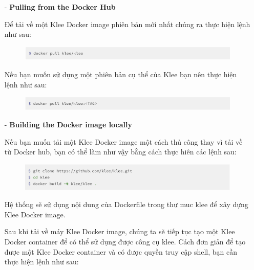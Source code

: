 \documentclass[12pt,a4paper]{article}
\begin{document}
\begin{itemize}
\item[-] \textbf{Pulling from the Docker Hub}

Để tải về một Klee Docker image phiên bản mới nhất chúng ra thực hiện lệnh như sau:

\begin{figure}[ht]
\begin{center}
\includegraphics[scale=.3]{hinhanh/pulldocker.png}
\end{center}
\end{figure}

Nếu bạn muốn sử dụng một phiên bản cụ thể của Klee bạn nên thực hiện lệnh như sau:

\begin{figure}[ht]
\begin{center}
\includegraphics[scale=.3]{hinhanh/pulldockertag.png}
\end{center}
\end{figure}

\item[-] \textbf{Building the Docker image locally}

Nếu bạn muốn tải một Klee Docker image một cách thủ công thay vì tải về từ Docker hub, bạn có thể làm như vậy bằng cách thực hiên các lệnh sau:

\begin{figure}[ht]
\begin{center}
\includegraphics[scale=0.3]{hinhanh/builddockerlocal.png}
\end{center}
\end{figure}

Hệ thống sẽ sử dụng nội dung của Dockerfile trong thư muc klee để xây dựng Klee Docker image.

Sau khi tải về máy Klee Docker image, chúng ta sẽ tiếp tục tạo một Klee Docker container để có thể  sử dụng được công cụ klee. Cách đơn giản để tạo được một Klee Docker container và có được quyền truy cập shell, bạn cần thực hiện lệnh như sau: \newpage


\end{itemize}
\end{document}
